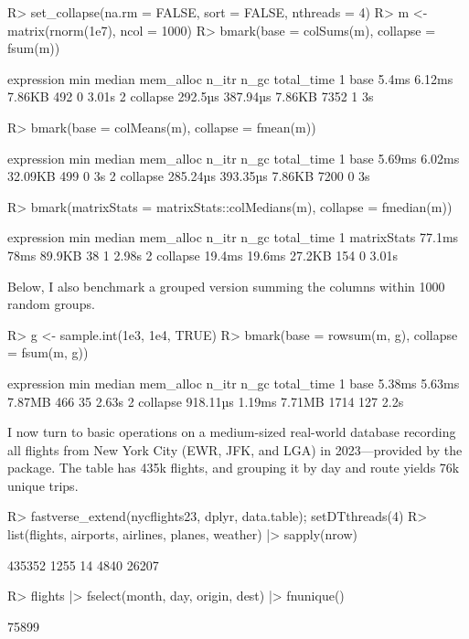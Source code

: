 \documentclass[article]{jss} %
\begin{document}
\begin{Schunk}
\begin{Sinput}
R> set_collapse(na.rm = FALSE, sort = FALSE, nthreads = 4)
R> m <- matrix(rnorm(1e7), ncol = 1000)
R> bmark(base = colSums(m), collapse = fsum(m))
\end{Sinput}
\begin{Soutput}
  expression     min   median mem_alloc n_itr n_gc total_time
1       base   5.4ms   6.12ms    7.86KB   492    0      3.01s
2   collapse 292.5µs 387.94µs    7.86KB  7352    1         3s
\end{Soutput}
\begin{Sinput}
R> bmark(base = colMeans(m), collapse = fmean(m))
\end{Sinput}
\begin{Soutput}
  expression      min   median mem_alloc n_itr n_gc total_time
1       base   5.69ms   6.02ms   32.09KB   499    0         3s
2   collapse 285.24µs 393.35µs    7.86KB  7200    0         3s
\end{Soutput}
\begin{Sinput}
R> bmark(matrixStats = matrixStats::colMedians(m), collapse = fmedian(m))
\end{Sinput}
\begin{Soutput}
   expression    min median mem_alloc n_itr n_gc total_time
1 matrixStats 77.1ms   78ms    89.9KB    38    1      2.98s
2    collapse 19.4ms 19.6ms    27.2KB   154    0      3.01s
\end{Soutput}
\end{Schunk}
%
Below, I also benchmark a grouped version summing the columns within 1000 random groups.
%
\begin{Schunk}
\begin{Sinput}
R> g <- sample.int(1e3, 1e4, TRUE)
R> bmark(base = rowsum(m, g), collapse = fsum(m, g))
\end{Sinput}
\begin{Soutput}
  expression      min median mem_alloc n_itr n_gc total_time
1       base   5.38ms 5.63ms    7.87MB   466   35      2.63s
2   collapse 918.11µs 1.19ms    7.71MB  1714  127       2.2s
\end{Soutput}
\end{Schunk}
%
I now turn to basic operations on a medium-sized real-world database recording all flights from New York City (EWR, JFK, and LGA) in 2023---provided by the  package. The  table has 435k flights, and grouping it by day and route yields 76k unique trips.
%
\begin{Schunk}
\begin{Sinput}
R> fastverse_extend(nycflights23, dplyr, data.table); setDTthreads(4)
R> list(flights, airports, airlines, planes, weather) |> sapply(nrow)
\end{Sinput}
\begin{Soutput}
[1] 435352   1255     14   4840  26207
\end{Soutput}
\begin{Sinput}
R> flights |> fselect(month, day, origin, dest) |> fnunique()
\end{Sinput}
\begin{Soutput}
[1] 75899
\end{Soutput}
\end{Schunk}
\end{document}
